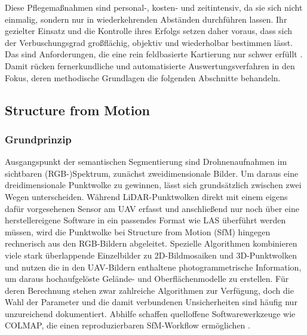 Diese Pflegemaßnahmen sind personal-, kosten- und zeitintensiv, da sie sich nicht einmalig, sondern nur in wiederkehrenden Abständen durchführen lassen. Ihr gezielter Einsatz und die Kontrolle ihres Erfolgs setzen daher voraus, dass sich der Verbuschungsgrad großflächig, objektiv und wiederholbar bestimmen lässt. Das sind Anforderungen, die eine rein feldbasierte Kartierung nur schwer erfüllt \cite{Kissling.2024}. Damit rücken fernerkundliche und automatisierte Auswertungsverfahren in den Fokus, deren methodische Grundlagen die folgenden Abschnitte behandeln.

\subsection{Structure from Motion}\label{structure_from_motion}

\subsubsection{Grundprinzip}\label{sfm_allgemeines}

Ausgangspunkt der semantischen Segmentierung sind Drohnenaufnahmen im sichtbaren (RGB-)Spektrum, zunächst zweidimensionale Bilder. Um daraus eine dreidimensionale Punktwolke zu gewinnen, lässt sich grundsätzlich zwischen zwei Wegen unterscheiden. Während LiDAR-Punktwolken direkt mit einem eigens dafür vorgesehenen Sensor am UAV erfasst und anschließend nur noch über eine herstellereigene Software in ein passendes Format wie LAS überführt werden müssen, wird die Punktwolke bei Structure from Motion (SfM) hingegen rechnerisch aus den RGB-Bildern abgeleitet. Spezielle Algorithmen kombinieren viele stark überlappende Einzelbilder zu 2D-Bildmosaiken und 3D-Punktwolken und nutzen die in den UAV-Bildern enthaltene photogrammetrische Information, um daraus hochaufgelöste Gelände- und Oberflächenmodelle zu erstellen. Für deren Berechnung stehen zwar zahlreiche Algorithmen zur Verfügung, doch die Wahl der Parameter und die damit verbundenen Unsicherheiten sind häufig nur unzureichend dokumentiert. Abhilfe schaffen quelloffene Softwarewerkzeuge wie COLMAP, die einen reproduzierbaren SfM-Workflow ermöglichen \cite{Kissling.2024}.

